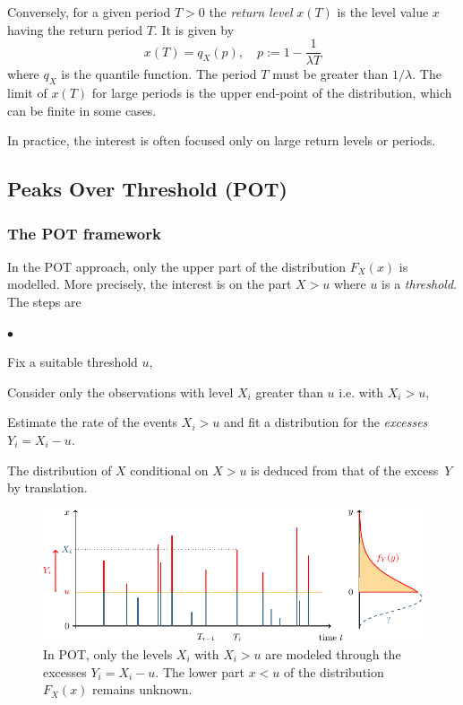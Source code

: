 \documentclass[a4paper]{report}
\begin{document}
Conversely, for a given period $T>0$ the \textit{return level} $x(T)$
is the level value $x$ having the return period $T$. It is given by
\begin{equation}
  \label{eq:RETLEV}
  x(T) = q_X(p),\quad p := 1 - \frac{1}{\lambda T}
\end{equation}
%
\noindent
where $q_X$ is the quantile function. The period $T$ must be greater
than $1/\lambda$. The limit of $x(T)$ for large periods is the upper
end-point of the distribution, which can be finite in some cases.

In practice, the interest is often focused only on
large return levels or periods.


\subsection{Peaks Over Threshold  (POT)}

\subsubsection*{The POT framework}
In the POT approach, only the upper part of the distribution $F_X(x)$
is modelled. More precisely, the interest is on the part $X > u$ where
$u$ is a \textit{threshold}.  The steps are 


\begin{list}{$\bullet$}{
  \setlength{\itemsep}{0pt} 
  \setlength{\topsep}{2pt}
  }
\item Fix a suitable threshold $u$,
\item Consider only the observations with level $X_i$ greater than $u$
  i.e. with $X_i>u$,
\item Estimate the rate of the events $X_i>u$ and fit a distribution 
  for the \textit{excesses} $Y_i = X_i -u$.
\end{list}
The distribution of $X$ conditional on $X>u$ is deduced from that of
the excess~$Y$ by translation.

\begin{figure}
  \centering
  \includegraphics[width=12cm]{images/POTu.pdf}
  \caption{\label{POTu} In POT, only the levels $X_i$ with $X_i>u$
    are modeled through the excesses $Y_i=X_i-u$. The lower part $x <u$
    of the distribution $F_X(x)$ remains unknown.}
\end{figure}
\end{document}
